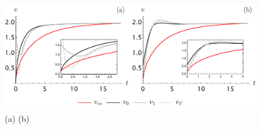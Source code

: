 \documentclass[amsmath,amssymb,amsfonts,aps,pre,preprint,superscriptaddress,bibnotes,showpacs,showkeys,longbibliography]{revtex4-1}
\begin{document}
\begin{figure}[!h]
    \centering
    \includegraphics[width=\linewidth]{Figures/VelocityMethodsGrid.pdf}
    \caption{(a) (b) }
    \label{fig:VelocityMethodsGrid}
\end{figure}


\end{document}
